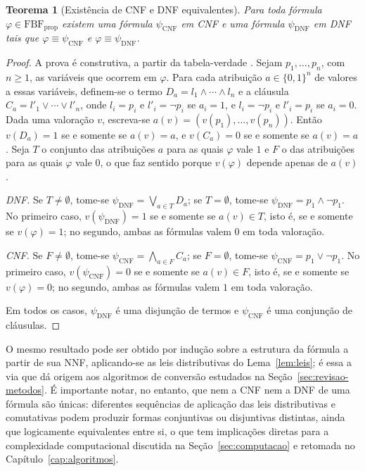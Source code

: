 \documentclass[12pt,a4paper,oneside]{report}
\theoremstyle{tituloplain}
\newtheorem{teorema}{Teorema}[chapter]
\theoremstyle{titulodef}
\begin{document}
\begin{teorema}[Existência de CNF e DNF equivalentes]\label{teo:cnf-dnf}
Para toda fórmula $\varphi\in\mathrm{FBF}_{\mathrm{prop}}$ existem uma fórmula $\psi_{\mathrm{CNF}}$ em CNF e uma fórmula $\psi_{\mathrm{DNF}}$ em DNF tais que $\varphi\equiv\psi_{\mathrm{CNF}}$ e $\varphi\equiv\psi_{\mathrm{DNF}}$.
\end{teorema}
\begin{proof}
A prova é construtiva, a partir da tabela-verdade \cite{chang1973}. Sejam $p_1,\dots,p_n$, com $n\geq 1$, as variáveis que ocorrem em $\varphi$. Para cada atribuição $a\in\{0,1\}^n$ de valores a essas variáveis, definem-se o termo $D_a=l_1\wedge\cdots\wedge l_n$ e a cláusula $C_a=l'_1\vee\cdots\vee l'_n$, onde $l_i=p_i$ e $l'_i=\neg p_i$ se $a_i=1$, e $l_i=\neg p_i$ e $l'_i=p_i$ se $a_i=0$. Dada uma valoração $v$, escreva-se $a(v)=(v(p_1),\dots,v(p_n))$. Então $v(D_a)=1$ se e somente se $a(v)=a$, e $v(C_a)=0$ se e somente se $a(v)=a$. Seja $T$ o conjunto das atribuições $a$ para as quais $\varphi$ vale $1$ e $F$ o das atribuições para as quais $\varphi$ vale $0$, o que faz sentido porque $v(\varphi)$ depende apenas de $a(v)$.

\emph{DNF.} Se $T\neq\emptyset$, tome-se $\psi_{\mathrm{DNF}}=\bigvee_{a\in T}D_a$; se $T=\emptyset$, tome-se $\psi_{\mathrm{DNF}}=p_1\wedge\neg p_1$. No primeiro caso, $v(\psi_{\mathrm{DNF}})=1$ se e somente se $a(v)\in T$, isto é, se e somente se $v(\varphi)=1$; no segundo, ambas as fórmulas valem $0$ em toda valoração.

\emph{CNF.} Se $F\neq\emptyset$, tome-se $\psi_{\mathrm{CNF}}=\bigwedge_{a\in F}C_a$; se $F=\emptyset$, tome-se $\psi_{\mathrm{CNF}}=p_1\vee\neg p_1$. No primeiro caso, $v(\psi_{\mathrm{CNF}})=0$ se e somente se $a(v)\in F$, isto é, se e somente se $v(\varphi)=0$; no segundo, ambas as fórmulas valem $1$ em toda valoração.

Em todos os casos, $\psi_{\mathrm{DNF}}$ é uma disjunção de termos e $\psi_{\mathrm{CNF}}$ é uma conjunção de cláusulas.
\end{proof}

O mesmo resultado pode ser obtido por indução sobre a estrutura da fórmula a partir de sua NNF, aplicando-se as leis distributivas do Lema~\ref{lem:leis}; é essa a via que dá origem aos algoritmos de conversão estudados na Seção~\ref{sec:revisao-metodos}. É importante notar, no entanto, que nem a CNF nem a DNF de uma fórmula são únicas: diferentes sequências de aplicação das leis distributivas e comutativas podem produzir formas conjuntivas ou disjuntivas distintas, ainda que logicamente equivalentes entre si, o que tem implicações diretas para a complexidade computacional discutida na Seção~\ref{sec:computacao} e retomada no Capítulo~\ref{cap:algoritmos}.
\end{document}
